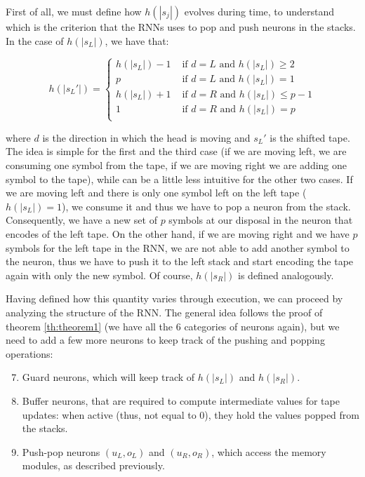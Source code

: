 \documentclass{article}
\begin{document}
First of all, we must define how $h(|s_j|)$ evolves during time, to understand which is the criterion that the RNNs uses to pop and push neurons in the stacks. In the case of $h(|s_L|)$, we have that:

\begin{equation}
    h(|s_L'|)=
    \begin{cases}
        h(|s_L|)-1 & \textrm{ if } d = L \textrm{ and } h(|s_L|) \geq 2\\
        p & \textrm{ if } d = L \textrm{ and } h(|s_L|) = 1\\
        h(|s_L|)+1 & \textrm{ if } d = R \textrm{ and } h(|s_L|) \leq p-1\\
        1 & \textrm{ if } d = R \textrm{ and } h(|s_L|) = p\\
    \end{cases}
\end{equation}

where $d$ is the direction in which the head is moving and $s_L'$ is the shifted tape. The idea is simple for the first and the third case (if we are moving left, we are consuming one symbol from the tape, if we are moving right we are adding one symbol to the tape), while can be a little less intuitive for the other two cases. If we are moving left and there is only one symbol left on the left tape ($h(|s_L|)=1$), we consume it and thus we have to pop a neuron from the stack. Consequently, we have a new set of $p$ symbols at our disposal in the neuron that encodes of the left tape. On the other hand, if we are moving right and we have $p$ symbols for the left tape in the RNN, we are not able to add another symbol to the neuron, thus we have to push it to the left stack and start encoding the tape again with only the new symbol. Of course, $h(|s_R|)$ is defined analogously.

Having defined how this quantity varies through execution, we can proceed by analyzing the structure of the RNN. The general idea follows the proof of theorem \ref{th:theorem1} (we have all the 6 categories of neurons again), but we need to add a few more neurons to keep track of the pushing and popping operations:

\begin{enumerate}
    \setcounter{enumi}{6}
    \item Guard neurons, which will keep track of $h(|s_L|)$ and $h(|s_R|)$.
    \item Buffer neurons, that are required to compute intermediate values for tape updates: when active (thus, not equal to $0$), they hold the values popped from the stacks.
    \item Push-pop neurons $(u_L,o_L)$ and $(u_R,o_R)$, which access the memory modules, as described previously.
\end{enumerate}
\end{document}
